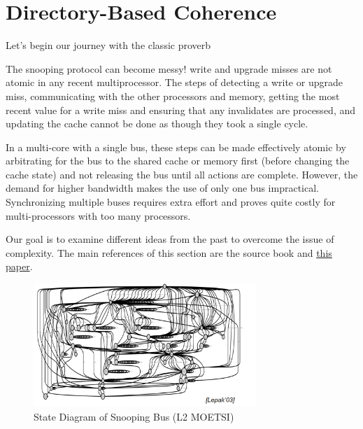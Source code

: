 \section{Directory-Based Coherence}
%

Let's begin our journey with the classic proverb



\vspace{1mm}

\noindent The snooping protocol can become messy! write and
upgrade misses are not atomic in any recent multiprocessor. The steps of detecting a write or upgrade miss, communicating with the other processors and
memory, getting the most recent value for a write miss and ensuring that any
invalidates are processed, and updating the cache cannot be done as though they
took a single cycle.

\noindent In a multi-core with a single bus, these steps can be made effectively atomic by
arbitrating for the bus to the shared cache or memory first (before changing the
cache state) and not releasing the bus until all actions are complete. However, the demand for higher bandwidth makes the use of only one bus impractical. Synchronizing multiple buses requires extra effort and proves quite costly for multi-processors with too many processors.

\vspace{1cm}
Our goal is to examine different ideas from the past to overcome the issue of complexity. The main references of this section are the source book and \href{https://course.ece.cmu.edu/~ece447/s15/lib/exe/fetch.php?media=censier.pdf}{this paper}.



\begin{figure}[h]
    \centering
    \includegraphics[width=0.75\textwidth]{snoop_bus.png}
    \caption{State Diagram of Snooping Bus (L2 MOETSI)}
    \label{fig:enter-label}
\end{figure}


